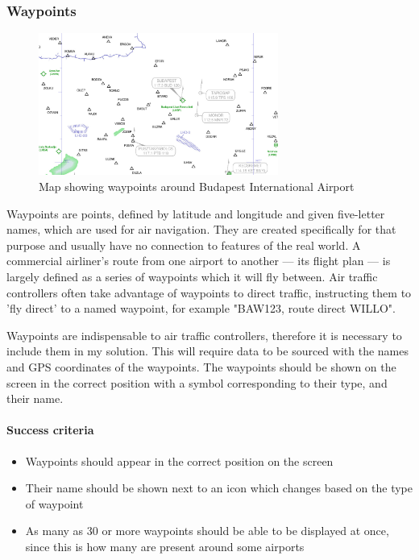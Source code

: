 \documentclass{article}
\begin{document}
\subsubsection{Waypoints}
\begin{figure}[H]
\centering
\includegraphics[width=0.7\textwidth]{context/budapest.png}
\caption{\label{fig:budapest}Map showing waypoints around Budapest International Airport}
\end{figure}
Waypoints are points, defined by latitude and longitude and given five-letter names, which are used for air navigation.
They are created specifically for that purpose and usually have no connection to features of the real world\cite{waypoint}.
A commercial airliner's route from one airport to another --- its flight plan --- is largely defined as a series of waypoints which it will fly between.
Air traffic controllers often take advantage of waypoints to direct traffic, instructing them to 'fly direct' to a named waypoint, for example "BAW123, route direct WILLO".

Waypoints are indispensable to air traffic controllers, therefore it is necessary to include them in my solution.
This will require data to be sourced with the names and GPS coordinates of the waypoints.
The waypoints should be shown on the screen in the correct position with a symbol corresponding to their type, and their name.

\paragraph{Success criteria}
\begin{itemize}
    \item Waypoints should appear in the correct position on the screen
    \item Their name should be shown next to an icon which changes based on the type of waypoint
    \item As many as 30 or more waypoints should be able to be displayed at once, since this is how many are present around some airports
\end{itemize}
\end{document}
